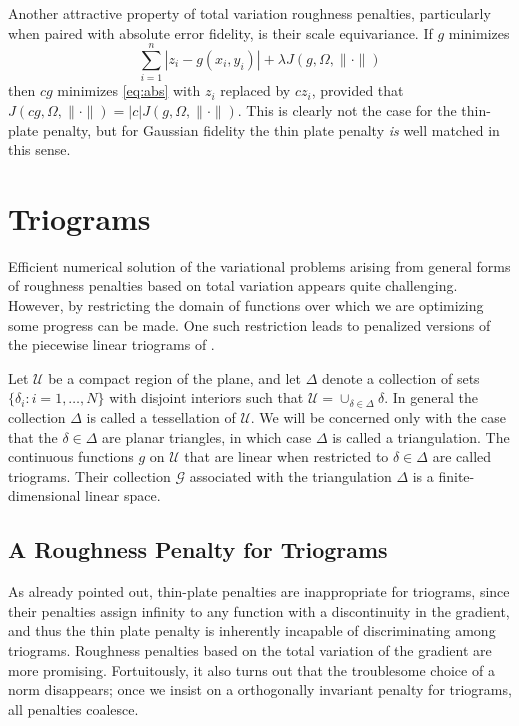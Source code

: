 Another attractive property of total variation roughness penalties,
particularly when paired with absolute error fidelity, is their scale
equivariance. If $g$ minimizes
\begin{equation}
\label{eq:abs}
\sum_{i=1}^n |z_i - g(x_i,y_i)| + \lambda J(g,\varOmega, \| \cdot \|)
\end{equation}
then $cg$ minimizes \eqref{eq:abs} with $z_i$ replaced by $cz_i$, provided
that $J(cg,\varOmega, \| \cdot \|) = |c| J(g,\varOmega, \| \cdot \|)$.
This is clearly not the case for the thin-plate penalty,  but
for Gaussian fidelity the thin plate penalty {\it is} well matched in
this sense.



\section{Triograms}

Efficient numerical solution of the variational problems arising from
general forms of roughness penalties based on total variation
appears quite challenging. However, by restricting the domain of
functions over which we are optimizing some progress can be made. One
such restriction leads to penalized versions of the piecewise linear
triograms of .

Let ${\mathcal U}$ be a
compact region of the plane, and let $\Delta$ denote a collection of
sets $\{ \delta_i: i=1, \ldots, N \}$ with disjoint interiors such that
${\mathcal U} = \cup_{\delta\in \Delta} \delta.$ In general the
collection $\Delta$ is called a tessellation of ${\mathcal U}$. We
will be concerned only with the case that the $\delta\in\Delta$ are
planar triangles, in which case $\Delta$ is called a triangulation. 
The continuous functions $g$ on ${\mathcal U}$ that are linear when
restricted to $\delta\in\Delta$ are called triograms. Their collection
${\mathcal G}$ associated with the triangulation $\Delta$ is a
finite-dimensional linear space.


\subsection{A Roughness Penalty for Triograms}



As already pointed out, thin-plate penalties are inappropriate for
triograms, since their penalties assign infinity to any function with a
discontinuity in the gradient, and thus the thin plate penalty is
inherently incapable of discriminating among triograms.
Roughness penalties based on the total variation of the gradient are
more promising.  Fortuitously, it also turns out that the troublesome choice of a norm
disappears; once we insist on a orthogonally invariant penalty for
triograms, all penalties coalesce.


